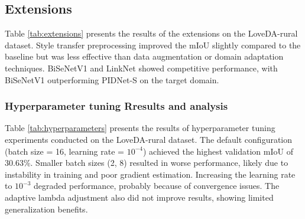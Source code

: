 \documentclass{article}
\begin{document}
\begin{multicols}{2}
		\subsection{Extensions}
		\justifying
		Table \ref{tab:extensions} presents the results of the extensions on the LoveDA-rural dataset. Style transfer preprocessing improved the mIoU slightly compared to the baseline but was less effective than data augmentation or domain adaptation techniques. BiSeNetV1 and LinkNet showed competitive performance, with BiSeNetV1 outperforming PIDNet-S on the target domain.
		

		\begin{table}[H]
			\centering
			\renewcommand{\arraystretch}{1.2} %
			\setlength{\tabcolsep}{14pt} %
			
			\caption{Performance comparison of different models on rural images.}
			\label{tab:extensions}

		\end{table}


        \subsubsection{Hyperparameter tuning Rresults and analysis}
        \justifying
        Table \ref{tab:hyperparameters} presents the results of hyperparameter tuning experiments conducted on the LoveDA-rural dataset. The default configuration (batch size = 16, learning rate = \(10^{-4}\)) achieved the highest validation mIoU of 30.63\%. Smaller batch sizes (2, 8) resulted in worse performance, likely due to instability in training and poor gradient estimation. Increasing the learning rate to \(10^{-3}\) degraded performance, probably because of convergence issues. The adaptive lambda adjustment also did not improve results, showing limited generalization benefits.
        


		\begin{table}[H]
			\centering
			\renewcommand{\arraystretch}{1.4} %
			\setlength{\tabcolsep}{6pt} %
			

\end{table}
\end{multicols}
\end{document}
